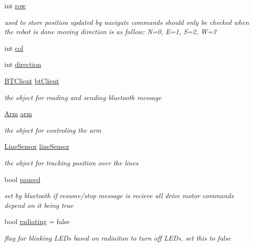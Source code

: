 \begin{DoxyCompactItemize}
\item 
int \hyperlink{classRobot_a35ce5c416a079fcf6b943843ec151d63}{row}
\begin{DoxyCompactList}\small\item\em used to store position updated by navigate commands should only be checked when the robot is done moving direction is as follow\-: N=0, E=1, S=2, W=3 \end{DoxyCompactList}\item 
int \hyperlink{classRobot_a2e08d53491bb82defe2e28ee9ce1d096}{col}
\item 
int \hyperlink{classRobot_ac25b4dfc2e9e5aa86ec5684d075d32b8}{direction}
\item 
\hyperlink{classBTClient}{B\-T\-Client} \hyperlink{classRobot_a9da91e6d551ed02038e935b3c755cc75}{bt\-Client}
\begin{DoxyCompactList}\small\item\em the object for reading and sending bluetooth message \end{DoxyCompactList}\item 
\hyperlink{classArm}{Arm} \hyperlink{classRobot_a444673862cbe384992aceb066282b500}{arm}
\begin{DoxyCompactList}\small\item\em the object for controling the arm \end{DoxyCompactList}\item 
\hyperlink{classLineSensor}{Line\-Sensor} \hyperlink{classRobot_abdc300045bea9a31013b25682629752d}{line\-Sensor}
\begin{DoxyCompactList}\small\item\em the object for tracking position over the lines \end{DoxyCompactList}\item 
bool \hyperlink{classRobot_a6a1fae6e6ee0a3298b9e60d3f50ad12a}{paused}
\begin{DoxyCompactList}\small\item\em set by bluetooth if resume/stop message is recieve all drive motor commands depend on it being true \end{DoxyCompactList}\item 
bool \hyperlink{classRobot_a77f62d85ab1cf34e79c2a3acd470a4ce}{radiating} = false
\begin{DoxyCompactList}\small\item\em flag for blinking L\-E\-Ds based on radiaiton to turn off L\-E\-Ds, set this to false \end{DoxyCompactList}\end{DoxyCompactItemize}
